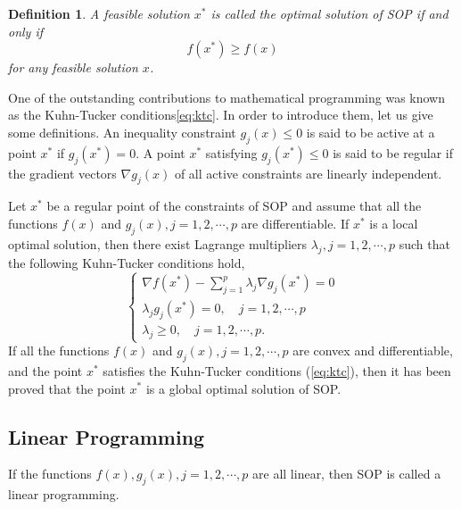 \newtheorem{mpdefop}[mpdef]{Definition}
\begin{mpdefop}
A feasible solution $x^*$ is called the optimal
solution of SOP if and only if
\begin{equation}
f(x^*)\ge f(x)
\end{equation}
for any feasible solution $x$.
\end{mpdefop}

One of the outstanding contributions to mathematical programming was known as
the Kuhn-Tucker conditions\ref{eq:ktc}. In order to introduce them, let us give
some definitions. An inequality constraint $g_j(x)\le 0$ is said to be active at
a point $x^*$ if $g_j(x^*)=0$. A point $x^*$ satisfying $g_j(x^*)\le 0$ is said
to be regular if the gradient vectors $\nabla g_j(x)$ of all active constraints
are linearly independent.

Let $x^*$ be a regular point of the constraints of SOP and assume that all the
functions $f(x)$ and $g_j(x),j=1,2,\cdots,p$ are differentiable. If $x^*$ is a
local optimal solution, then there exist Lagrange multipliers
$\lambda_j,j=1,2,\cdots,p$ such that the following Kuhn-Tucker conditions hold,
\begin{equation}
\label{eq:ktc}
\left\{\begin{array}{l}
    \nabla f(x^*)-\sum\limits_{j=1}^p\lambda_j\nabla g_j(x^*)=0\\[0.3cm]
    \lambda_jg_j(x^*)=0,\quad j=1,2,\cdots,p\\[0.2cm]
    \lambda_j\ge 0,\quad j=1,2,\cdots,p.
\end{array}\right.
\end{equation}
If all the functions $f(x)$ and $g_j(x),j=1,2,\cdots,p$ are convex and
differentiable, and the point $x^*$ satisfies the Kuhn-Tucker conditions
(\ref{eq:ktc}), then it has been proved that the point $x^*$ is a global optimal
solution of SOP.

\subsection{Linear Programming}
\label{sec:lp}

If the functions $f(x),g_j(x),j=1,2,\cdots,p$ are all linear, then SOP is called
a linear programming.

